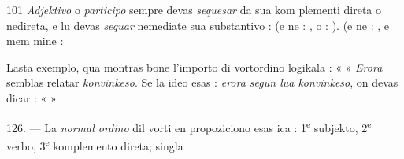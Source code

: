 \begin{VUpage}[105]{101}
\textit{Adjektivo} o \textit{participo} sempre devas \textit{sequesar} da sua kom\cc
plementi direta o nedireta, e lu devas \textit{sequar} nemediate sua\nl
substantivo :  (e ne : \nl
{}, o : ). \nl
{} (e ne : \cc
{}, e mem mine : 

Lasta exemplo, qua montras bone l'importo di vortordino\nl
logikala : « \cc
{} » \textit{Erora} semblas relatar \textit{konvinkeso}.\nl
Se la ideo esas : \textit{erora segun lua konvinkeso}, on devas dicar :\nl
« \nl
{} »

\VUblanc{4.65pt}%
126. --- La \textit{normal ordino} dil vorti en propoziciono esas\nl
ica : 1\textsuperscript{e} subjekto, 2\textsuperscript{e} verbo, 3\textsuperscript{e} komplemento direta; singla\parplein
\end{VUpage}

